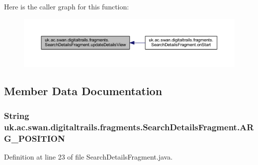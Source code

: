 Here is the caller graph for this function\+:\nopagebreak
\begin{figure}[H]
\begin{center}
\leavevmode
\includegraphics[width=350pt]{classuk_1_1ac_1_1swan_1_1digitaltrails_1_1fragments_1_1_search_details_fragment_a30a52dee58e0523db1319bd1b5dfdc77_icgraph}
\end{center}
\end{figure}




\subsection{Member Data Documentation}
\hypertarget{classuk_1_1ac_1_1swan_1_1digitaltrails_1_1fragments_1_1_search_details_fragment_aad25040ec92e3ffc5c69918cfa23a20b}{
\subsubsection[{A\+R\+G\+\_\+\+P\+O\+S\+I\+T\+I\+O\+N}]{\setlength{\rightskip}{0pt plus 5cm}String uk.\+ac.\+swan.\+digitaltrails.\+fragments.\+Search\+Details\+Fragment.\+A\+R\+G\+\_\+\+P\+O\+S\+I\+T\+I\+O\+N\hspace{0.3cm}{\ttfamily [static]}}}\label{classuk_1_1ac_1_1swan_1_1digitaltrails_1_1fragments_1_1_search_details_fragment_aad25040ec92e3ffc5c69918cfa23a20b}


Definition at line 23 of file Search\+Details\+Fragment.\+java.

